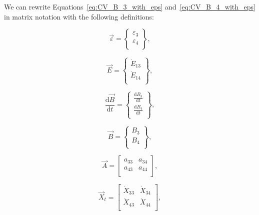 We can rewrite Equations~\ref{eq:CV_B_3_with_eps} 
and~\ref{eq:CV_B_4_with_eps} in matrix notation with the following definitions:

\begin{equation} \label{eq:eps_vec_def}
	\vec{\varepsilon} =		\begin{Bmatrix} 	\varepsilon_{3}	\\
																\varepsilon_{4}	\\
									\end{Bmatrix},
\end{equation}

\begin{equation} \label{eq:E_vec_def}
	\vec{E} =		\begin{Bmatrix} 	\dot{E}_{13}	\\
													\dot{E}_{14}\\
						\end{Bmatrix},
\end{equation}

\begin{equation} \label{eq:dBdt_vec_def}
	\frac{\mathrm{d}\vec{B}}{\mathrm{d}t} =	\begin{Bmatrix}	\frac{\mathrm{d}B_{3}}{\mathrm{d}t}	\\
																									\frac{\mathrm{d}B_{4}}{\mathrm{d}t}\\
																		\end{Bmatrix},
\end{equation}

\begin{equation} \label{eq:B_vec_def}
	\vec{B} =			\begin{Bmatrix}	B_{3}\\
														B_{4}\\
							\end{Bmatrix},
\end{equation}

\begin{equation} \label{eq:A_matrix_def}
	\vec{A} =	\begin{bmatrix} 	a_{33} & a_{34}	\\
												a_{43} & a_{44}	\\
					\end{bmatrix},
\end{equation}

\begin{equation} \label{eq:X_t_matrix_def}
	\vec{X}_{t} =		\begin{bmatrix} 	\dot{X}_{33}		&	\dot{X}_{34}	\\
														\dot{X}_{43}		&	\dot{X}_{44}\\
							\end{bmatrix},
\end{equation}

